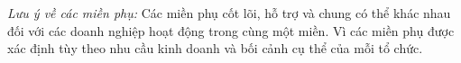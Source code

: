 
\emph{Lưu ý về các miền phụ:}    Các miền phụ cốt lõi, hỗ trợ và chung có thể khác nhau đối với các doanh nghiệp hoạt động trong cùng một miền.    Vì các miền phụ được xác định tùy theo nhu cầu kinh doanh và bối cảnh cụ thể của mỗi tổ chức.